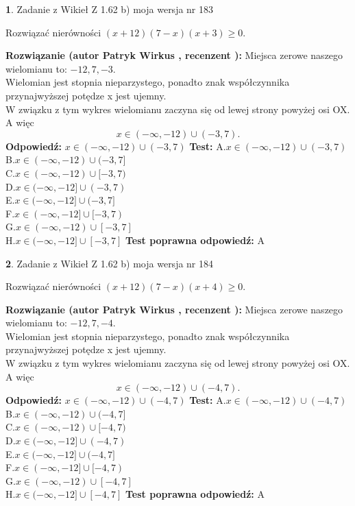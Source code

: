 \documentclass[12pt, a4paper]{article}
\theoremstyle{definition} %
\newtheorem{zad}{}
\newcommand{\zadStart}[1]{\begin{zad}#1\newline}
\newcommand{\zadStop}{\end{zad}}
\newcommand{\rozwStart}[2]{\noindent \textbf{Rozwiązanie (autor #1 , recenzent #2): }\newline}
\newcommand{\rozwStop}{\newline}
\newcommand{\odpStart}{\noindent \textbf{Odpowiedź:}\newline}
\newcommand{\odpStop}{\newline}
\newcommand{\testStart}{\noindent \textbf{Test:}\newline}
\newcommand{\testStop}{\newline}
\newcommand{\kluczStart}{\noindent \textbf{Test poprawna odpowiedź:}\newline}
\newcommand{\kluczStop}{\newline}
\begin{document}
\zadStart{Zadanie z Wikieł Z 1.62 b) moja wersja nr 183}

Rozwiązać nierówności $(x+12)(7-x)(x+3)\ge0$.
\zadStop
\rozwStart{Patryk Wirkus}{}
Miejsca zerowe naszego wielomianu to: $-12, 7, -3$.\\
Wielomian jest stopnia nieparzystego, ponadto znak współczynnika przy\linebreak najwyższej potędze x jest ujemny.\\ W związku z tym wykres wielomianu zaczyna się od lewej strony powyżej osi OX. A więc $$x \in (-\infty,-12) \cup (-3,7).$$
\rozwStop
\odpStart
$x \in (-\infty,-12) \cup (-3,7)$
\odpStop
\testStart
A.$x \in (-\infty,-12) \cup (-3,7)$\\
B.$x \in (-\infty,-12) \cup (-3,7]$\\
C.$x \in (-\infty,-12) \cup [-3,7)$\\
D.$x \in (-\infty,-12] \cup (-3,7)$\\
E.$x \in (-\infty,-12] \cup (-3,7]$\\
F.$x \in (-\infty,-12] \cup [-3,7)$\\
G.$x \in (-\infty,-12) \cup [-3,7]$\\
H.$x \in (-\infty,-12] \cup [-3,7]$
\testStop
\kluczStart
A
\kluczStop



\zadStart{Zadanie z Wikieł Z 1.62 b) moja wersja nr 184}

Rozwiązać nierówności $(x+12)(7-x)(x+4)\ge0$.
\zadStop
\rozwStart{Patryk Wirkus}{}
Miejsca zerowe naszego wielomianu to: $-12, 7, -4$.\\
Wielomian jest stopnia nieparzystego, ponadto znak współczynnika przy\linebreak najwyższej potędze x jest ujemny.\\ W związku z tym wykres wielomianu zaczyna się od lewej strony powyżej osi OX. A więc $$x \in (-\infty,-12) \cup (-4,7).$$
\rozwStop
\odpStart
$x \in (-\infty,-12) \cup (-4,7)$
\odpStop
\testStart
A.$x \in (-\infty,-12) \cup (-4,7)$\\
B.$x \in (-\infty,-12) \cup (-4,7]$\\
C.$x \in (-\infty,-12) \cup [-4,7)$\\
D.$x \in (-\infty,-12] \cup (-4,7)$\\
E.$x \in (-\infty,-12] \cup (-4,7]$\\
F.$x \in (-\infty,-12] \cup [-4,7)$\\
G.$x \in (-\infty,-12) \cup [-4,7]$\\
H.$x \in (-\infty,-12] \cup [-4,7]$
\testStop
\kluczStart
A
\kluczStop
\end{document}
